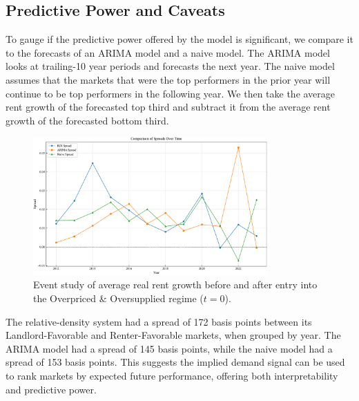 \documentclass[APA,Times1COL]{WileyNJDv5} %
\begin{document}
\subsection{Predictive Power and Caveats}

To gauge if the predictive power offered by the model is significant, we compare it to the forecasts of an ARIMA model and a naive model. The ARIMA model looks at trailing-10 year periods and forecasts the next year. The naive model assumes that the markets that were the top performers in the prior year will continue to be top performers in the following year. We then take the average rent growth of the forecasted top third and subtract it from the average rent growth of the forecasted bottom third.

\begin{figure}[h]
	\centering
	\includegraphics[width=0.8\textwidth]{spread_comparison_over_time.pdf}
	\caption*{Event study of average real rent growth before and after entry into the Overpriced \& Oversupplied regime ($t=0$).}
	\label{fig:spread_compare}
\end{figure}


The relative-density system had a spread of 172 basis points between its Landlord-Favorable and Renter-Favorable markets, when grouped by year. The ARIMA model had a spread of 145 basis points, while the naive model had a spread of 153 basis points. This suggests the implied demand signal can be used to rank markets by expected future performance, offering both interpretability and predictive power.
\end{document}
